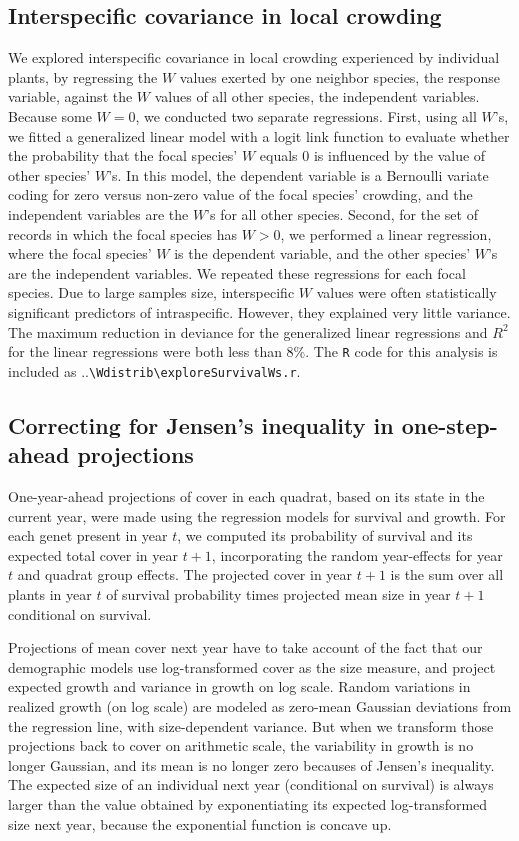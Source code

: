 \documentclass[11pt]{article}
\begin{document}
\subsection{Interspecific covariance in local crowding} 
We explored interspecific covariance in local crowding experienced by individual plants, by regressing the $W$ values exerted by one neighbor species,
 the response variable, against the $W$ values of all other species, the independent variables. Because some $W=0$, we conducted two 
 separate regressions. First, using all $W$'s, we fitted a generalized linear model with a logit link function to evaluate whether the 
 probability that the focal species' $W$ equals 0 is influenced by the value of other species' $W$'s. In this model, the dependent 
 variable is a Bernoulli variate coding for zero versus non-zero value of the focal species' crowding, and the independent 
 variables are the $W$'s for all other species. Second, for the set of records in which the focal species has $W>0$, we 
 performed a linear regression, where the focal species' $W$ is the dependent variable, and the other species' $W$'s are 
 the independent variables. We repeated these regressions for each focal species. Due to large samples size, interspecific $W$ 
 values were often statistically significant predictors of intraspecific. However, they explained very little variance. The 
 maximum reduction in deviance for the generalized linear regressions and $R^2$ for the linear regressions were both less 
 than 8\%. The \texttt{R} code for this analysis is included as ..\texttt{\textbackslash Wdistrib\textbackslash exploreSurvivalWs.r}.
 
\subsection{Correcting for Jensen's inequality in one-step-ahead projections} 
One-year-ahead projections of cover in each quadrat, based on its state in the current year, were made using the regression models for survival and growth. 
For each genet present in year $t$, we computed its probability of survival and its expected total cover in year $t+1$, incorporating the random 
year-effects for year $t$ and quadrat group effects. The projected cover in year $t+1$ is the sum over all plants in year $t$ of survival probability times  
projected mean size in year $t+1$ conditional on survival. 

Projections of mean cover next year have to take account of the fact that our demographic models use log-transformed cover as the size measure, 
and project expected growth and variance in growth on log scale. Random variations in realized growth (on log scale) are modeled as zero-mean Gaussian deviations from the 
regression line, with size-dependent variance. But when we transform those projections back to cover on arithmetic scale, the variability in growth is no longer Gaussian, and 
its mean is no longer zero becauses of Jensen's inequality. The expected size of an individual next year (conditional on survival) is always larger than the value 
obtained by exponentiating its expected log-transformed size next year, because the exponential function is concave up.  
\end{document}
